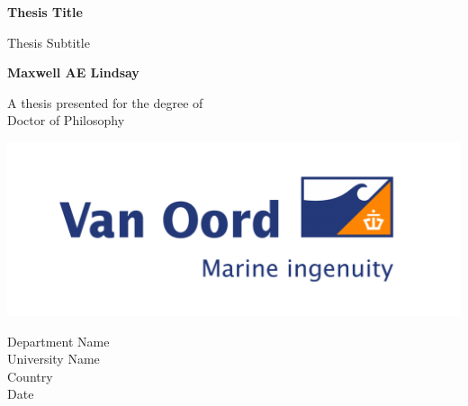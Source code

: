 \begin{titlepage}
  \begin{center}
      \vspace*{1cm}
      \color{white}
      \Huge
      \textbf{Thesis Title}

      \vspace{0.5cm}
       Thesis Subtitle
           
      \vspace{1.5cm}
      \Large
      \textbf{Maxwell AE Lindsay}

      \large
      \vfill
           
      A thesis presented for the degree of\\
      Doctor of Philosophy
           
      \vspace{0.8cm}
    
      \includegraphics[width=\pagewidth]{figures/VanOord-2048x785.png}

           
      Department Name\\
      University Name\\
      Country\\
      Date
           
  \end{center}
\end{titlepage}